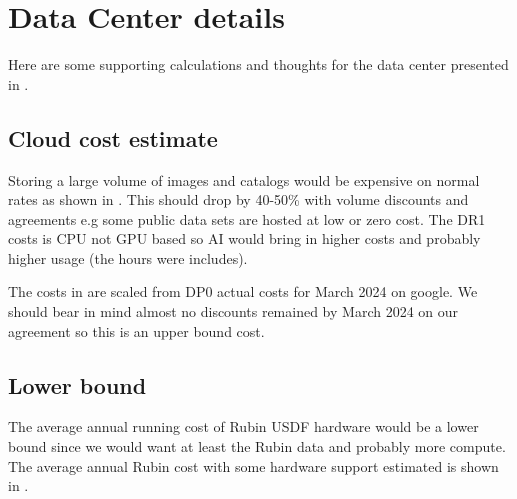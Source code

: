 \section{Data Center details} \label{sec:dcdetail}
Here are some supporting calculations and thoughts for the data center presented in .


\subsection{Cloud cost estimate}\label{dec:cloudcost}
Storing a large volume of images and catalogs would be expensive on normal rates as shown in .
This should drop by 40-50\% with volume discounts and agreements e.g some public data sets are hosted at low or zero cost.
The DR1 costs is CPU not GPU based so AI would bring in higher costs and probably higher usage (the hours were includes).



The costs in  are scaled from DP0 actual costs for March 2024 on google.
We should bear in mind almost no discounts remained by March 2024 on our agreement so this is an upper bound cost.



\subsection{Lower bound}
The average annual running cost of Rubin USDF hardware would be a lower bound since we would want at least the Rubin data and probably more compute.
The average annual Rubin cost with some hardware support estimated is shown in .



